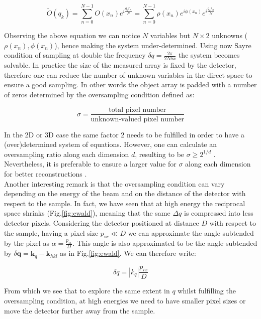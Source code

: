 \begin{equation}
    \widetilde{O}(q_k) = \sum_{n = 0}^{N-1}O(x_n)e^{ i \frac{q_{k} r_{n}}{N}} = \sum_{n = 0}^{N-1}\rho(x_n)e^{ i \phi(x_n)}e^{ i \frac{q_{k} r_{n}}{N}} 
\end{equation}

Observing the above equation we can notice $N$ variables but $N\times 2$ unknowns ($\rho(x_n), \phi(x_n)$), hence 
making the system under-determined. Using now Sayre condition of sampling at double the frequency $\delta q = \frac{2\pi}{2 N \delta x}$ 
the system becomes solvable. 
In practice the size of the measured array is fixed by the detector, therefore one can reduce the number of unknown 
variables in the direct space to ensure a good sampling. In other words the object array is padded with a number of zeros 
determined by the oversampling condition defined as: 

\begin{equation}
    \sigma = \frac{\text{total pixel number}}{\text{unknown-valued pixel number}}
\end{equation}

In the 2D or 3D case the same factor 2 needs to be fulfilled in order to have a (over)determined system of equations. However,
one can calculate an oversampling ratio along each dimension $d$, resulting to be $\sigma \ge 2^{1/d}$ \cite{Latychevskaia:18}. 
Nevertheless, it is preferable to ensure a larger value for $\sigma$ along each dimension for better reconstructions \cite{Veen_2004, Ozturk_2017}. \\

Another interesting remark is that the oversampling condition can vary depending on the energy of the beam and on the 
distance of the detector with respect to the sample. 
In fact, we have seen that at high energy the reciprocal space shrinks (Fig.\ref{fig:ewald}), meaning that the same $\Delta q$ is compressed 
into less detector pixels. Considering the detector positioned at distance $D$ with respect to the sample, having a pixel 
size $p_{ix} \ll D$ we can approximate the angle subtended by the pixel as $\alpha = \frac{p_{ix}}{D}$. This angle 
is also approximated to be the angle subtended by $\delta \mathbf{q} = \mathbf{k}_{q} - \mathbf{k}_{hkl} $ as in Fig.\ref{fig:ewald}. 
We can therefore write: 

\begin{equation}
    \delta q = |k_{q}|\frac{p_{ix}}{D} 
\end{equation}

From which we see that to explore the same extent in $q$ whilst fulfilling the oversampling condition, at high energies 
we need to have smaller pixel sizes or move the detector further away from the sample. 

